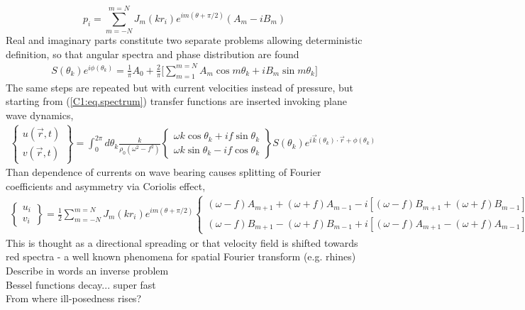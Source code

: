 \begin{equation}
\label{C1:p.eq}
p_i = \sum_{m = -N}^{m = N} J_m(k r_i) e^{im(\theta + \pi/2)} (A_m  - i B_m)
\end{equation}
Real and imaginary parts constitute two separate problems allowing deterministic definition, so that angular spectra and phase distribution are found
\begin{align*}
S(\theta_k) e^{i \phi(\theta_k)} = \frac{1}{\pi} A_0 + \frac{2}{\pi} \big[ \sum_{m = 1}^{m = N} A_m \cos m\theta_k + i B_m \sin m\theta_k \big]
\end{align*}
The same steps are repeated but with current velocities instead of pressure, but starting from (\ref{C1:eq.spectrum}) transfer functions are inserted invoking plane wave dynamics,
\begin{align}
\begin{Bmatrix}
u(\vec{r}, t) \\ v(\vec{r}, t)
\end{Bmatrix}
=\int_0^{2\pi} d \theta_k \frac{k}{\rho_0 (\omega^2 - f^2)} 
\begin{Bmatrix}
\omega k \cos \theta_k + i f \sin \theta_k \\ \omega k \sin \theta_k - i f \cos \theta_k
\end{Bmatrix}
S(\theta_k) e^{i \vec{k}(\theta_k) \cdot \vec{r} + \phi(\theta_k)}
\end{align}
Than dependence of currents on wave bearing causes splitting of Fourier coefficients and asymmetry via Coriolis effect,
\begin{align}
\label{uv.eq}
\begin{Bmatrix}
u_i \\ v_i
\end{Bmatrix}
= \frac{1}{2} \sum_{m = -N}^{m = N} J_{m} (kr_i) e^{im(\theta + \pi/2)}
\begin{Bmatrix}
(\omega - f) A_{m + 1} + (\omega + f) A_{m - 1} - i [(\omega - f) B_{m + 1} + (\omega + f) B_{m - 1}] \\ 
(\omega - f) B_{m + 1} - (\omega + f) B_{m - 1} + i [ (\omega - f) A_{m + 1} - (\omega + f) A_{m - 1}]
\end{Bmatrix}
\end{align}
This is thought as a directional spreading or that velocity field is shifted towards red spectra - a well known phenomena for spatial Fourier transform (e.g. rhines)
Describe in words an inverse problem\\
Bessel functions decay... super fast\\
From where ill-posedness rises?\\
